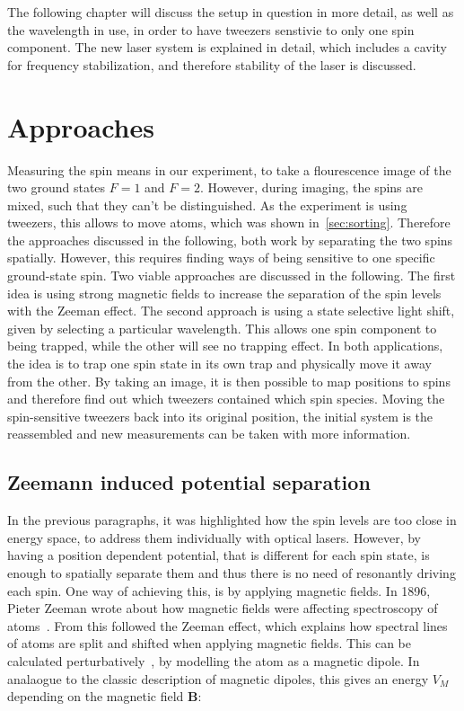 The following chapter will discuss the setup in question in more detail, as well as the wavelength in use, in order to have tweezers senstivie to only one spin component. The new laser system is explained in detail, which includes a cavity for frequency stabilization, and therefore stability of the laser is discussed.

\section{Approaches}

Measuring the spin means in our experiment, to take a flourescence image of the two ground states $F=1$ and $F=2$. However, during imaging, the spins are mixed, such that they can't be distinguished. As the experiment is using tweezers, this allows to move atoms, which was shown in~\ref{sec:sorting}. Therefore the approaches discussed in the following, both work by separating the two spins spatially. However, this requires finding ways of being sensitive to one specific ground-state spin. Two viable approaches are discussed in the following. The first idea is using strong magnetic fields to increase the separation of the spin levels with the Zeeman effect. The second approach is using a state selective light shift, given by selecting a particular wavelength. This allows one spin component to being trapped, while the other will see no trapping effect. In both applications, the idea is to trap one spin state in its own trap and physically move it away from the other. By taking an image, it is then possible to map positions to spins and therefore find out which tweezers contained which spin species. Moving the spin-sensitive tweezers back into its original position, the initial system is the reassembled and new measurements can be taken with more information.

\subsection{Zeemann induced potential separation}

In the previous paragraphs, it was highlighted how the spin levels are too close in energy space, to address them individually with optical lasers. However, by having a position dependent potential, that is different for each spin state, is enough to spatially separate them and thus there is no need of resonantly driving each spin. One way of achieving this, is by applying magnetic fields. In 1896, Pieter Zeeman wrote about how magnetic fields were affecting spectroscopy of atoms~\cite{Zeeman1896}. From this followed the Zeeman effect, which explains how spectral lines of atoms are split and shifted when applying magnetic fields. This can be calculated perturbatively~\cite{Griffiths2004}, by modelling the atom as a magnetic dipole. In analaogue to the classic description of magnetic dipoles, this gives an energy $V_M$ depending on the magnetic field $\bm{B}$:

